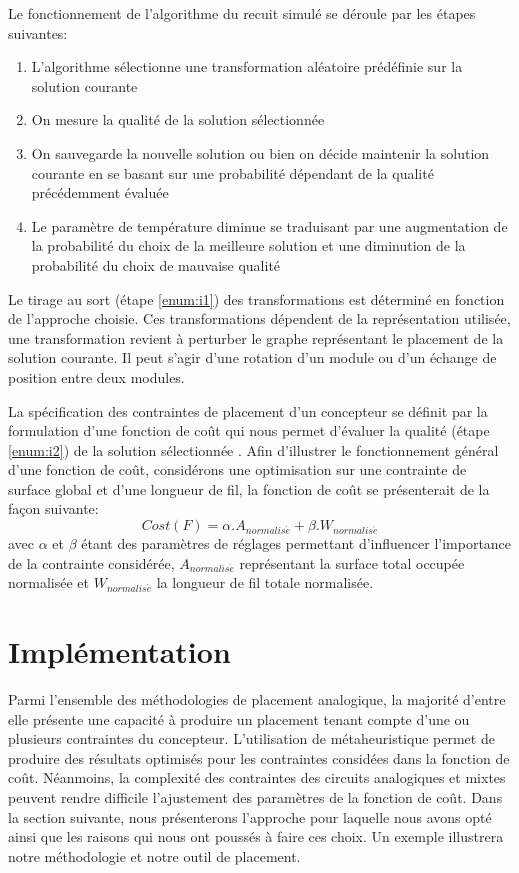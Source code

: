 Le fonctionnement de l'algorithme du recuit simulé se déroule par les étapes suivantes:
\begin{enumerate}
\item \label{enum:i1} L'algorithme sélectionne une transformation aléatoire prédéfinie sur la solution courante 
\item \label{enum:i2} On mesure la qualité de la solution sélectionnée 
\item On sauvegarde la nouvelle solution ou bien on décide maintenir la solution courante en se basant sur une probabilité dépendant de la qualité précédemment évaluée
\item Le paramètre de température diminue se traduisant par une augmentation de la probabilité du choix de la meilleure solution et une diminution de la probabilité du choix de mauvaise qualité
\end{enumerate}
Le tirage au sort (étape \ref{enum:i1}) des transformations est déterminé en fonction de l'approche choisie. Ces transformations dépendent de la représentation utilisée, une transformation revient à perturber le graphe représentant le placement de la solution courante. Il peut s'agir d'une rotation d'un module ou d'un échange de position entre deux modules. \newline 

La spécification des contraintes de placement d'un concepteur se définit par la formulation d'une fonction de coût qui nous permet d'évaluer la qualité (étape \ref{enum:i2}) de la solution sélectionnée . Afin d'illustrer le fonctionnement général d'une fonction de coût, considérons une optimisation sur une contrainte de surface global et d'une longueur de fil, la fonction de coût se présenterait de la façon suivante:
\begin{equation}\label{eq:1}
  Cost(F) =  \alpha . A_{normalis \acute{e}} + \beta . W_{normalis \acute{e}}
\end{equation}
avec $\alpha$ et $\beta$ étant des paramètres de réglages permettant d'influencer l'importance de la contrainte considérée, $A_{normalis \acute{e}}$ représentant la surface total occupée normalisée et $W_{normalis \acute{e}}$ la longueur de fil totale normalisée.
\newpage
\section{Implémentation}
\label{sec:Placement-Implémentation}
Parmi l'ensemble des méthodologies de placement analogique, la majorité d'entre elle présente une capacité à produire un placement tenant compte d'une ou plusieurs contraintes du concepteur. L'utilisation de métaheuristique permet de produire des résultats optimisés pour les contraintes considées dans la fonction de coût. Néanmoins, la complexité des contraintes des circuits analogiques et mixtes peuvent rendre difficile l'ajustement des paramètres de la fonction de coût. Dans la section suivante, nous présenterons l'approche pour laquelle nous avons opté ainsi que les raisons qui nous ont poussés à faire ces choix. Un exemple illustrera notre méthodologie et notre outil de placement.

